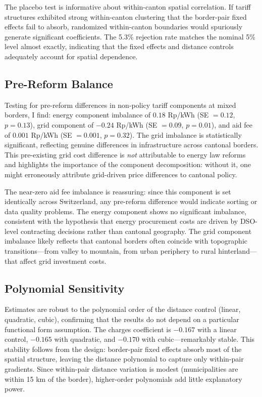 \documentclass[12pt]{article}
\begin{document}
The placebo test is informative about within-canton spatial correlation. If tariff structures exhibited strong within-canton clustering that the border-pair fixed effects fail to absorb, randomized within-canton boundaries would spuriously generate significant coefficients. The 5.3\% rejection rate matches the nominal 5\% level almost exactly, indicating that the fixed effects and distance controls adequately account for spatial dependence.

\subsection{Pre-Reform Balance}

Testing for pre-reform differences in non-policy tariff components at mixed borders, I find: energy component imbalance of $0.18$ Rp/kWh (SE $= 0.12$, $p = 0.13$), grid component of $-0.24$ Rp/kWh (SE $= 0.09$, $p = 0.01$), and aid fee of $0.001$ Rp/kWh (SE $= 0.001$, $p = 0.32$). The grid imbalance is statistically significant, reflecting genuine differences in infrastructure across cantonal borders. This pre-existing grid cost difference is \textit{not} attributable to energy law reforms and highlights the importance of the component decomposition: without it, one might erroneously attribute grid-driven price differences to cantonal policy.

The near-zero aid fee imbalance is reassuring: since this component is set identically across Switzerland, any pre-reform difference would indicate sorting or data quality problems. The energy component shows no significant imbalance, consistent with the hypothesis that energy procurement costs are driven by DSO-level contracting decisions rather than cantonal geography. The grid component imbalance likely reflects that cantonal borders often coincide with topographic transitions---from valley to mountain, from urban periphery to rural hinterland---that affect grid investment costs.

\subsection{Polynomial Sensitivity}

Estimates are robust to the polynomial order of the distance control (linear, quadratic, cubic), confirming that the results do not depend on a particular functional form assumption. The charges coefficient is $-0.167$ with a linear control, $-0.165$ with quadratic, and $-0.170$ with cubic---remarkably stable. This stability follows from the design: border-pair fixed effects absorb most of the spatial structure, leaving the distance polynomial to capture only within-pair gradients. Since within-pair distance variation is modest (municipalities are within 15 km of the border), higher-order polynomials add little explanatory power.
\end{document}
